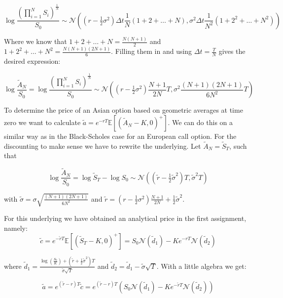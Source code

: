 \documentclass[11pt,a4paper]{article}
\begin{document}
\begin{equation}
\log\frac{\left(\prod_{i=1}^N S_i\right)^{\frac{1}{N}}}{S_0}\sim\mathcal{N}\left((r-\tfrac{1}{2}\sigma^2)\Delta t\frac{1}{N}(1+2+\ldots+N),\sigma^2 \Delta t \frac{1}{N^2}(1+2^2+\ldots+N^2)\right)
\end{equation}

Where we know that $1+2+\ldots+N=\frac{N(N+1)}{2}$ and $1+2^2+\ldots+N^2=\frac{N(N+1)(2N+1)}{6}$. Filling them in and using $\Delta t=\frac{T}{N}$ gives the desired expression:

\begin{equation}
\log \frac{\widetilde{A}_N}{S_0}=\log\frac{\left(\prod_{i=1}^N S_i\right)^{\frac{1}{N}}}{S_0}\sim\mathcal{N}\left((r-\tfrac{1}{2}\sigma^2)\frac{N+1}{2N}T,\sigma^2 \frac{(N+1)(2N+1)}{6N^2}T\right)
\end{equation}

To determine the price of an Asian option based on geometric averages at time zero we want to calculate $\tilde{a}=e^{-rT}\mathbb{E}\left[(\widetilde{A}_N-K,0)^+\right]$. We can do this on a similar way as in the Black-Scholes case for an European call option. For the discounting to make sense we have to rewrite the underlying. Let $\widetilde{A}_N=\widetilde{S}_T$, such that

\begin{equation}
\log \frac{\widetilde{A}_N}{S_0}=\log \widetilde{S}_T-\log S_0\sim\mathcal{N}((\tilde{r}-\tfrac{1}{2}\tilde{\sigma}^2)T,\tilde{\sigma}^2T)
\end{equation}

with $\tilde{\sigma}=\sigma\sqrt{\frac{(N+1)(2N+1)}{6N^2}}$ and $\tilde{r}=(r-\tfrac{1}{2}\sigma^2)\frac{N+1}{2N}+\tfrac{1}{2}\tilde{\sigma}^2$.

For this underlying we have obtained an analytical price in the first assignment, namely:
\begin{equation}
\tilde{c}=e^{-\tilde{r}T}\mathbb{E}\left[(\widetilde{S}_T-K,0)^+\right]=S_0\mathcal{N}(\tilde{d}_1)-Ke^{-rT}\mathcal{N}(\tilde{d}_2)
\end{equation}

where $\tilde{d}_1=\frac{\log\left(\frac{S_0}{K}\right)+\left(\tilde{r}+\frac{1}{2}\tilde{\sigma}^2\right)T}{\tilde{\sigma}\sqrt{T}}$ and $\tilde{d}_2=\tilde{d}_1-\tilde{\sigma}\sqrt{T}$. With a little algebra we get:

\begin{equation}
\label{eq:asiangeom}
\tilde{a}=e^{(\tilde{r}-r)T}\tilde{c}=e^{(\tilde{r}-r)T}(S_0\mathcal{N}(\tilde{d}_1)-Ke^{-\tilde{r}T}\mathcal{N}(\tilde{d}_2))
\end{equation}
\end{document}
